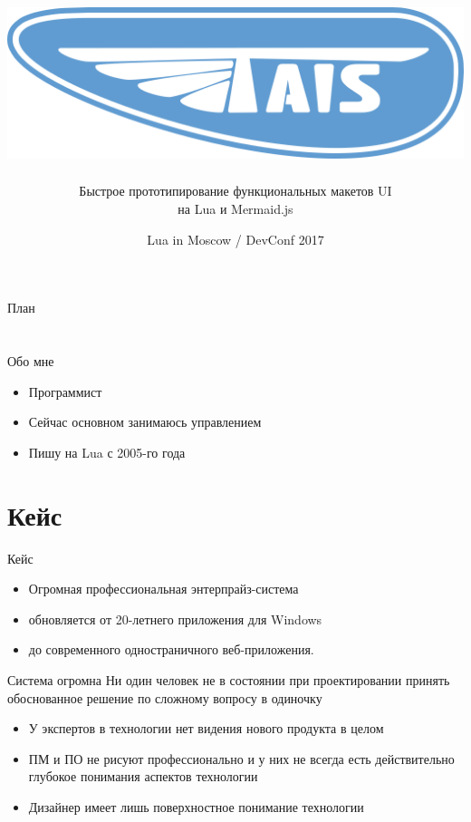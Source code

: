 \documentclass[aspectratio=169,handout,bigger]{beamer}
\title{\includegraphics[height=.15\textheight]{logo}}
\author{Быстрое прототипирование функциональных макетов UI\\на Lua и Mermaid.js}
\institute{Александр Гладыш\\@agladysh}
\date{Lua in Moscow / DevConf 2017}
\begin{document}
\begin{frame}[plain]
 \titlepage
\end{frame}


\begin{frame}{План}

\tableofcontents

\end{frame}


\section*{}

\begin{frame}{Обо мне}

\begin{itemize}
\item Программист
\item Сейчас основном занимаюсь управлением
\item Пишу на Lua с 2005-го года
\end{itemize}

\end{frame}

\section{Кейс}

\begin{frame}{Кейс}
  \begin{itemize}
    \item Огромная профессиональная энтерпрайз-система
    \item обновляется от 20-летнего приложения для Windows
    \item до современного одностраничного веб-приложения.
  \end{itemize}
\end{frame}


\begin{frame}{Система огромна}
  Ни один человек не в состоянии при проектировании принять обоснованное решение
  по сложному вопросу в одиночку

  \begin{itemize}
    \item У экспертов в технологии нет видения нового продукта в целом
    \item ПМ и ПО не рисуют профессионально
          и у них не всегда есть действительно глубокое понимания
          аспектов технологии
    \item Дизайнер имеет лишь поверхностное понимание технологии
  \end{itemize}
\end{frame}
\end{document}
